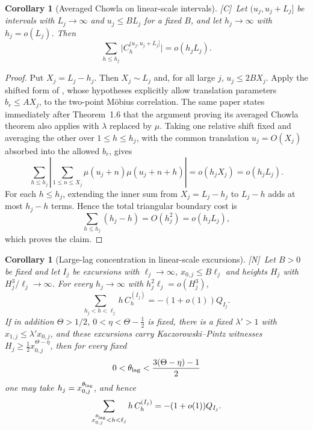 \documentclass[11pt,reqno]{amsart}
\numberwithin{equation}{section}
\theoremstyle{plain}
\newtheorem{corollary}[theorem]{Corollary}
\theoremstyle{definition}
\theoremstyle{remark}
\newcommand{\tagN}{\textup{[N]}}
\newcommand{\tagC}{\textup{[C]}}
\begin{document}
\begin{corollary}[Averaged Chowla on linear-scale intervals]
\label{cor:chowla-linear}
\tagC\ Let $(u_j,u_j+L_j]$ be intervals with $L_j\to\infty$ and $u_j\le BL_j$ for a
fixed $B$, and let $h_j\to\infty$ with $h_j=o(L_j)$. Then
\begin{equation}
\sum_{h\le h_j}\bigl|C^{(u_j,u_j+L_j]}_h\bigr|=o(h_jL_j).
\end{equation}
\end{corollary}

\begin{proof}
Put $X_j=L_j-h_j$. Then $X_j\sim L_j$ and, for all large $j$,
$u_j\le2B X_j$. Apply the shifted form of
\cite[Theorem~1.6]{MRT15}, whose hypotheses explicitly allow translation
parameters $b_r\le A X_j$, to the two-point M\"obius correlation. The same
paper states immediately after Theorem~1.6 that the argument proving its
averaged Chowla theorem also applies with $\lambda$ replaced by $\mu$.
Taking one relative shift fixed and averaging the other over
$1\le h\le h_j$, with the common translation $u_j=O(X_j)$ absorbed into
the allowed $b_r$, gives
\begin{equation}
 \sum_{h\le h_j}\left|
 \sum_{1\le n\le X_j}\mu(u_j+n)\mu(u_j+n+h)
 \right|=o(h_jX_j)=o(h_jL_j).
\end{equation}
For each $h\le h_j$, extending the inner sum from $X_j=L_j-h_j$ to
$L_j-h$ adds at most $h_j-h$ terms. Hence the total triangular boundary
cost is
\begin{equation}
 \sum_{h\le h_j}(h_j-h)=O(h_j^2)=o(h_jL_j),
\end{equation}
which proves the claim.
\end{proof}

\begin{corollary}[Large-lag concentration in linear-scale excursions]
\label{cor:large-lag}
\tagN\ Let $B>0$ be fixed and let $I_j$ be excursions with $\ell_j\to\infty$,
$x_{0,j}\le B\ell_j$ and heights $H_j$ with $H_j^3/\ell_j\to\infty$. For every $h_j\to\infty$ with
$h_j^2\ell_j=o(H_j^3)$,
\begin{equation}
\sum_{h_j<h<\ell_j}h\,C^{(I_j)}_h=-(1+o(1))Q_{I_j}.
\end{equation}
If in addition $\Theta>1/2$, $0<\eta<\Theta-\frac12$ is fixed, there is a
fixed $\lambda'>1$ with $x_{1,j}\le\lambda' x_{0,j}$, and these excursions carry
Kaczorowski--Pintz witnesses
$H_j\ge\frac12x_{0,j}^{\Theta-\eta}$, then for every fixed
\begin{equation}
0<\theta_{\rm lag}<\frac{3(\Theta-\eta)-1}{2}
\end{equation}
one may take $h_j=x_{0,j}^{\theta_{\rm lag}}$, and hence
\begin{equation}
\sum_{x_{0,j}^{\theta_{\rm lag}}<h<\ell_j}h\,C_h^{(I_j)}=-(1+o(1))Q_{I_j}.
\end{equation}
\end{corollary}
\end{document}
